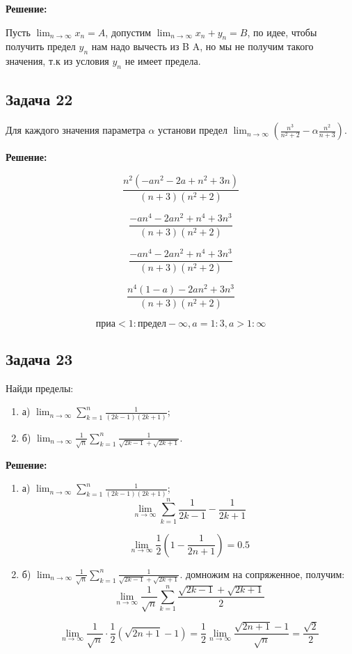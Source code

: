 \documentclass[a4paper,12pt]{article}
\begin{document}
\textbf{Решение: }

Пусть $\lim_{n \to \infty} x_n = A$, допустим $\lim_{n \to \infty} x_n+y_n = B$, по идее, чтобы получить предел $y_n$ нам надо вычесть из B A, но мы не получим такого значения, т.к из условия $y_n$ не имеет предела.

\subsection{Задача 22}
Для каждого значения параметра $\alpha$ установи предел $\lim_{n \to \infty} \left(\frac{n^3}{n^2 + 2} - \alpha\frac{n^2}{n+3}\right)$.

\textbf{Решение: }

\[
\frac{n^2(-an^2-2a+n^2+3n)}{(n+3)(n^2+2)}
\]

\[
\frac{-an^4-2an^2+n^4+3n^3}{(n+3)(n^2+2)}
\]

\[
\frac{-an^4-2an^2+n^4+3n^3}{(n+3)(n^2+2)}
\]

\[
\frac{n^4(1-a)-2an^2+3n^3}{(n+3)(n^2+2)}
\]

\[
при а<1: предел -\infty, a=1: 3, a>1: \infty
\]
\subsection{Задача 23}
Найди пределы:
\begin{enumerate}
    \item а) $\lim_{n \to \infty} \sum_{k=1}^{n} \frac{1}{(2k-1)(2k+1)}$;
    \item б) $\lim_{n \to \infty} \frac{1}{\sqrt{n}} \sum_{k=1}^{n} \frac{1}{\sqrt{2k-1} + \sqrt{2k+1}}$.
\end{enumerate}
\textbf{Решение:}
\begin{enumerate}
    \item а) $\lim_{n \to \infty} \sum_{k=1}^{n} \frac{1}{(2k-1)(2k+1)}$;
    \[
    \lim_{n \to \infty} \sum_{k=1}^{n} \frac{1}{2k-1} - \frac{1}{2k+1}
    \]

    \[
    \lim_{n \to \infty} \frac{1}{2} \left( 1 - \frac{1}{2n+1} \right) = 0.5
    \]
    
    \item б) $\lim_{n \to \infty} \frac{1}{\sqrt{n}} \sum_{k=1}^{n} \frac{1}{\sqrt{2k-1} + \sqrt{2k+1}}$.
    домножим на сопряженное, получим: 
    \[
    \lim_{n \to \infty} \frac{1}{\sqrt{n}} \sum_{k=1}^{n} \frac{\sqrt{2k-1} + \sqrt{2k+1}}{2}
    \]

    \[
    \lim_{n \to \infty} \frac{1}{\sqrt{n}} \cdot \frac{1}{2} \left( \sqrt{2n+1} - 1 \right) = \frac{1}{2} \lim_{n \to \infty} \frac{\sqrt{2n+1} - 1}{\sqrt{n}} = \frac{\sqrt{2}}{2}
    \]
    
\end{enumerate}
\end{document}
